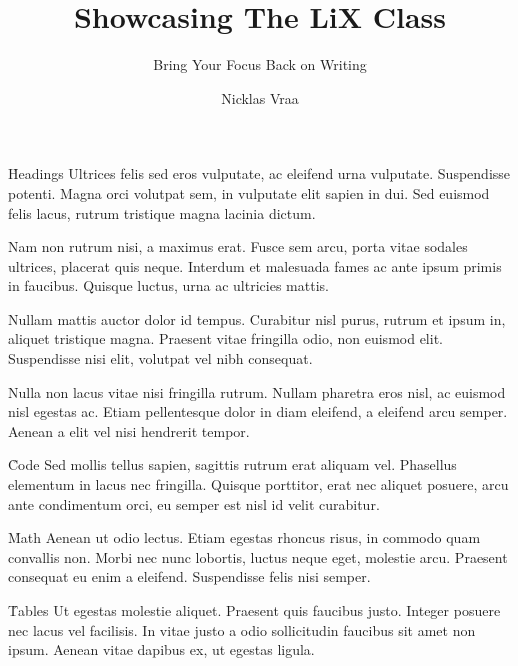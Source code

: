 \documentclass{paper}
\title     {Showcasing The LiX Class}
\subtitle  {Bring Your Focus Back on Writing}
\author    {Nicklas Vraa}
\begin{document}
\toc

\h{Headings}
Ultrices felis sed eros vulputate, ac eleifend urna vulputate. Suspendisse potenti. Magna orci volutpat sem, in vulputate elit sapien in dui. Sed euismod felis lacus, rutrum tristique magna lacinia dictum.

Nam non rutrum nisi, a maximus erat. Fusce sem arcu, porta vitae sodales ultrices, placerat quis neque. Interdum et malesuada fames ac ante ipsum primis in faucibus. Quisque luctus, urna ac ultricies mattis.

Nullam mattis auctor dolor id tempus. Curabitur nisl purus, rutrum et ipsum in, aliquet tristique magna. Praesent vitae fringilla odio, non euismod elit. Suspendisse nisi elit, volutpat vel nibh consequat.

Nulla non lacus vitae nisi fringilla rutrum. Nullam pharetra eros nisl, ac euismod nisl egestas ac. Etiam pellentesque dolor in diam eleifend, a eleifend arcu semper. Aenean a elit vel nisi hendrerit tempor.

\h{Code}
Sed mollis tellus sapien, sagittis rutrum erat aliquam vel. Phasellus elementum in lacus nec fringilla. Quisque porttitor, erat nec aliquet posuere, arcu ante condimentum orci, eu semper est nisl id velit curabitur.


\h{Math}
Aenean ut odio lectus. Etiam egestas rhoncus risus, in commodo quam convallis non. Morbi nec nunc lobortis, luctus neque eget, molestie arcu. Praesent consequat eu enim a eleifend. Suspendisse felis nisi semper.


\h{Tables}
Ut egestas molestie aliquet. Praesent quis faucibus justo. Integer posuere nec lacus vel facilisis. In vitae justo a odio sollicitudin faucibus sit amet non ipsum. Aenean vitae dapibus ex, ut egestas ligula.

\end{document}
